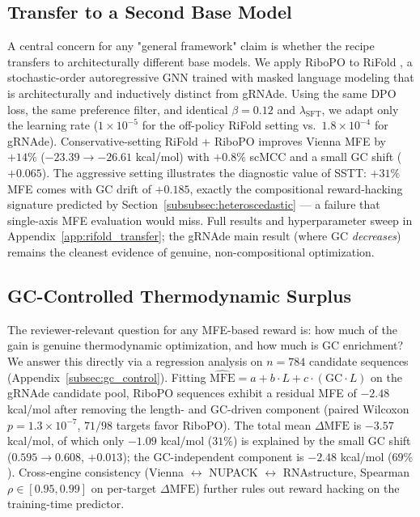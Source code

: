 

\subsection{Transfer to a Second Base Model}
\label{subsec:rifold_transfer_main}

A central concern for any "general framework" claim is whether the recipe transfers to architecturally different base models. We apply RiboPO to RiFold \citep{liu2025sentences}, a stochastic-order autoregressive GNN trained with masked language modeling that is architecturally and inductively distinct from gRNAde. Using the same DPO loss, the same preference filter, and identical $\beta = 0.12$ and $\lambda_{\text{SFT}}$, we adapt only the learning rate ($1\!\times\!10^{-5}$ for the off-policy RiFold setting vs.\ $1.8\!\times\!10^{-4}$ for gRNAde). Conservative-setting RiFold + RiboPO improves Vienna MFE by $+14\%$ ($-23.39 \to -26.61$ kcal/mol) with $+0.8\%$ scMCC and a small GC shift ($+0.065$). The aggressive setting illustrates the diagnostic value of SSTT: $+31\%$ MFE comes with GC drift of $+0.185$, exactly the compositional reward-hacking signature predicted by Section~\ref{subsubsec:heteroscedastic} --- a failure that single-axis MFE evaluation would miss. Full results and hyperparameter sweep in Appendix~\ref{app:rifold_transfer}; the gRNAde main result (where GC \emph{decreases}) remains the cleanest evidence of genuine, non-compositional optimization.


\subsection{GC-Controlled Thermodynamic Surplus}
\label{subsec:gc_control_main}

The reviewer-relevant question for any MFE-based reward is: how much of the gain is genuine thermodynamic optimization, and how much is GC enrichment? We answer this directly via a regression analysis on $n=784$ candidate sequences (Appendix~\ref{subsec:gc_control}). Fitting $\widehat{\mathrm{MFE}} = a + b\cdot L + c\cdot(\mathrm{GC}\!\cdot\! L)$ on the gRNAde candidate pool, RiboPO sequences exhibit a residual MFE of $-2.48$ kcal/mol after removing the length- and GC-driven component (paired Wilcoxon $p = 1.3\!\times\!10^{-7}$, $71/98$ targets favor RiboPO). The total mean $\Delta\mathrm{MFE}$ is $-3.57$ kcal/mol, of which only $-1.09$ kcal/mol ($31\%$) is explained by the small GC shift ($0.595\!\to\!0.608$, $+0.013$); the GC-independent component is $-2.48$ kcal/mol ($69\%$). Cross-engine consistency (Vienna $\leftrightarrow$ NUPACK $\leftrightarrow$ RNAstructure, Spearman $\rho \in [0.95, 0.99]$ on per-target $\Delta\mathrm{MFE}$) further rules out reward hacking on the training-time predictor.


